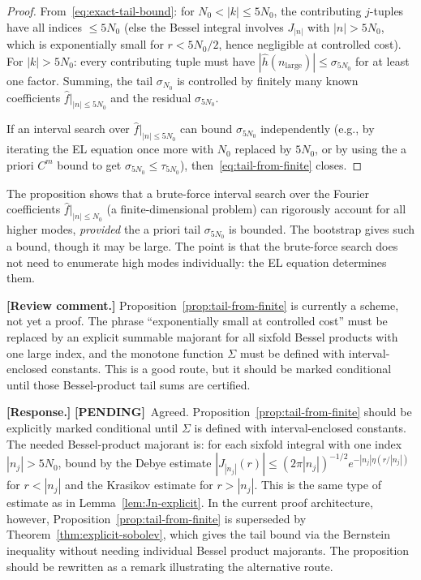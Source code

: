 \documentclass[12pt]{article}
\theoremstyle{definition}
\theoremstyle{remark}
\newcommand{\wh}{\widehat}
\newcommand{\review}[1]{\par\smallskip\noindent\textbf{\color{red}[Review comment.]} {\color{red}#1}\par\smallskip}
\newcommand{\response}[1]{\par\noindent\textbf{\color{blue}[Response.]} {\color{blue}#1}\par\smallskip}
\newcommand{\pending}{\textbf{\color{orange}[PENDING]}}
\begin{document}
\begin{proof}
  From~\eqref{eq:exact-tail-bound}: for $N_0<|k|\leq 5N_0$, the
  contributing $j$-tuples have all indices $\leq 5N_0$ (else the
  Bessel integral involves $J_{|n|}$ with $|n|>5N_0$, which is
  exponentially small for $r<5N_0/2$, hence negligible at controlled
  cost).  For $|k|>5N_0$: every contributing tuple must have
  $|\wh h(n_{\mathrm{large}})|\leq\sigma_{5N_0}$ for at least one
  factor.  Summing, the tail $\sigma_{N_0}$ is controlled by finitely
  many known coefficients $\wh f|_{|n|\leq 5N_0}$ and the residual
  $\sigma_{5N_0}$.

  If an interval search over $\wh f|_{|n|\leq 5N_0}$ can bound
  $\sigma_{5N_0}$ independently (e.g., by iterating the EL equation
  once more with $N_0$ replaced by $5N_0$, or by using the a priori
  $C^m$ bound to get $\sigma_{5N_0}\leq\tau_{5N_0}$),
  then~\eqref{eq:tail-from-finite} closes.
\end{proof}

The proposition shows that a brute-force interval search over the
Fourier coefficients $\wh f|_{|n|\leq N_0}$ (a finite-dimensional
problem) can rigorously account for all higher modes, \emph{provided}
the a priori tail $\sigma_{5N_0}$ is bounded.  The bootstrap gives
such a bound, though it may be large.  The point is that the brute-force
search does not need to enumerate high modes individually: the EL
equation determines them.

\review{Proposition~\ref{prop:tail-from-finite} is currently a scheme,
not yet a proof.  The phrase ``exponentially small at controlled cost''
must be replaced by an explicit summable majorant for all sixfold Bessel
products with one large index, and the monotone function $\Sigma$ must be
defined with interval-enclosed constants.  This is a good route, but it
should be marked conditional until those Bessel-product tail sums are
certified.}

\response{\pending\ Agreed.  Proposition~\ref{prop:tail-from-finite}
should be explicitly marked conditional until $\Sigma$ is defined with
interval-enclosed constants.  The needed Bessel-product majorant is:
for each sixfold integral with one index $|n_j|>5N_0$, bound by the
Debye estimate $|J_{|n_j|}(r)|\leq(2\pi|n_j|)^{-1/2}e^{-|n_j|\eta(r/|n_j|)}$
for $r<|n_j|$ and the Krasikov estimate for $r>|n_j|$.  This is the same
type of estimate as in Lemma~\ref{lem:Jn-explicit}.  In the current proof
architecture, however, Proposition~\ref{prop:tail-from-finite} is
superseded by Theorem~\ref{thm:explicit-sobolev}, which gives the tail
bound via the Bernstein inequality without needing individual Bessel
product majorants.  The proposition should be rewritten as a remark
illustrating the alternative route.}
\end{document}
